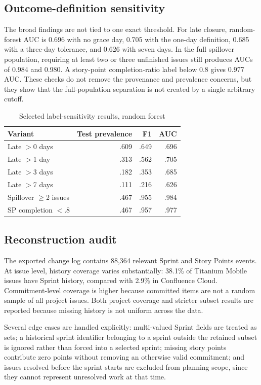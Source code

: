 \documentclass[conference]{IEEEtran}
\begin{document}
\subsection{Outcome-definition sensitivity}
The broad findings are not tied to one exact threshold. For late closure, random-forest AUC is 0.696 with no grace day, 0.705 with the one-day definition, 0.685 with a three-day tolerance, and 0.626 with seven days. In the full spillover population, requiring at least two or three unfinished issues still produces AUCs of 0.984 and 0.980. A story-point completion-ratio label below 0.8 gives 0.977 AUC. These checks do not remove the provenance and prevalence concerns, but they show that the full-population separation is not created by a single arbitrary cutoff.

\begin{table}[!htb]
\centering\scriptsize
\caption{Selected label-sensitivity results, random forest}
\label{tab:labelsens}
\setlength{\tabcolsep}{3pt}
\begin{tabular}{@{}lrrr@{}}
\toprule
Variant & Test prevalence & F1 & AUC\\
\midrule
Late $>$0 days & .609 & .649 & .696\\
Late $>$1 day & .313 & .562 & .705\\
Late $>$3 days & .182 & .353 & .685\\
Late $>$7 days & .111 & .216 & .626\\
Spillover $\geq$2 issues & .467 & .955 & .984\\
SP completion $<$.8 & .467 & .957 & .977\\
\bottomrule
\end{tabular}
\end{table}

\subsection{Reconstruction audit}
The exported change log contains 88,364 relevant Sprint and Story Points events. At issue level, history coverage varies substantially: 38.1\% of Titanium Mobile issues have Sprint history, compared with 2.9\% in Confluence Cloud. Commitment-level coverage is higher because committed items are not a random sample of all project issues. Both project coverage and stricter subset results are reported because missing history is not uniform across the data.

Several edge cases are handled explicitly: multi-valued Sprint fields are treated as sets; a historical sprint identifier belonging to a sprint outside the retained subset is ignored rather than forced into a selected sprint; missing story points contribute zero points without removing an otherwise valid commitment; and issues resolved before the sprint starts are excluded from planning scope, since they cannot represent unresolved work at that time.
\end{document}
